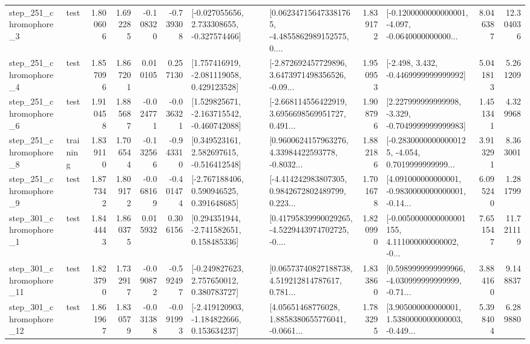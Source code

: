 \begin{tabular}{llrrrrllrlrr}
   step\_251\_chromophore\_3 &      test &      1.800606 &    1.692285 &     -0.108320 & -0.739308 &   [-0.027055656, 2.733308655, -0.327574466] &  [0.062347156473381765, -4.4855862989152575, 0.... &       1.839172 &  [-0.1200000000000001, -4.097, -0.0640000000000... &            8.046387 &         12.304036 \\
   step\_251\_chromophore\_4 &      test &      1.857096 &    1.867201 &      0.010105 &  0.257130 &    [1.757416919, -2.081119058, 0.429123528] &  [-2.872692457729896, 3.6473971498356526, -0.09... &       1.950953 &               [-2.498, 3.432, -0.4469999999999992] &            5.041813 &          5.261209 \\
   step\_251\_chromophore\_6 &      test &      1.910458 &    1.885687 &     -0.024771 & -0.036321 &   [1.529825671, -2.163715542, -0.460742088] &  [-2.668114556422919, 3.6956698569951727, 0.491... &       1.908796 &   [2.227999999999998, -3.329, -0.7049999999999983] &            1.451341 &          4.329968 \\
   step\_251\_chromophore\_8 &  training &      1.839110 &    1.706544 &     -0.132566 & -0.943310 &    [0.349523161, 2.582697615, -0.516412548] &  [0.9600624157963276, 4.33984422593778, -0.8032... &       1.882186 &  [-0.28300000000000125, -4.054, 0.7019999999999... &            3.913291 &          8.363001 \\
   step\_251\_chromophore\_9 &      test &      1.877342 &    1.809172 &     -0.068169 & -0.401474 &    [-2.767188406, 0.590946525, 0.391648685] &  [-4.414242983807305, 0.9842672802489799, 0.223... &       1.701678 &  [4.091000000000001, -0.9830000000000001, -0.14... &            6.095240 &          1.281799 \\
   step\_301\_chromophore\_1 &      test &      1.844443 &    1.860375 &      0.015932 &  0.306156 &    [0.294351944, -2.741582651, 0.158485336] &  [0.41795839990029265, -4.5229443974702725, -0.... &       1.820990 &  [-0.0050000000000001155, 4.111000000000002, -0... &            7.651547 &         11.721119 \\
  step\_301\_chromophore\_11 &      test &      1.823790 &    1.732917 &     -0.090872 & -0.592497 &    [-0.249827623, 2.757650012, 0.380783727] &  [0.06573740827188738, 4.519212814787617, 0.781... &       1.833860 &  [0.5989999999999966, -4.030999999999999, -0.71... &            3.884160 &          9.148837 \\
  step\_301\_chromophore\_12 &      test &      1.861967 &    1.830579 &     -0.031388 & -0.091993 &   [-2.419120903, -1.184822666, 0.153634237] &  [4.05651468776028, 1.8858380655776041, -0.0661... &       1.783295 &  [3.905000000000001, 1.5380000000000003, -0.449... &            5.398404 &          6.289880 \\

\end{tabular}

